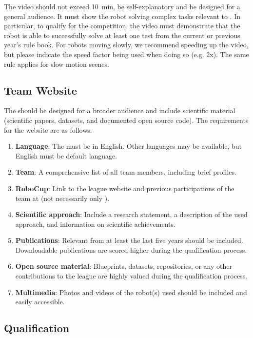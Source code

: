 The video should not exceed \SI{10}{\minute}, be self-explanatory and be designed for a general audience.
It must show the robot solving complex tasks relevant to \AtHome{}. 
In particular, to qualify for the competition, the video must demonstrate that the robot is able to successfully solve at least one test from the current or previous year's rule book.
For robots moving slowly, we recommend speeding up the video, but please indicate the speed factor being used when doing so (e.g. 2x). The same rule applies for slow motion scenes.

\subsection{Team Website}

The  should be designed for a broader audience and include scientific material (scientific papers, datasets, and documented open source code).
The requirements for the website are as follows:

\begin{enumerate}
	\item \textbf{Language}: The  must be in English. Other languages may be available, but English must be default language.
	\item \textbf{Team}: A comprehensive list of all team members, including brief profiles.
	\item \textbf{RoboCup}: Link to the league website and previous participations of the team at \RoboCup{} (not necessarily only \AtHome{}).
	\item \textbf{Scientific approach}: Include a research statement, a description of the used approach, and information on scientific achievements.
	\item \textbf{Publications}: Relevant  from at least the last five years should be included. Downloadable publications are scored higher during the qualification process.
	\item \textbf{Open source material}: Blueprints, datasets, repositories, or any other contributions to the league are highly valued during the qualification process.
	\item \textbf{Multimedia}: Photos and videos of the robot(s) used should be included and easily accessible.
\end{enumerate}

\subsection{Qualification}\label{rule:qualification}

